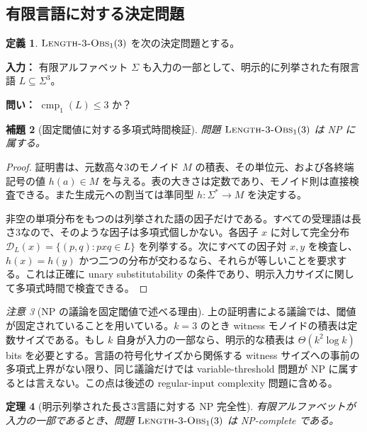 \documentclass[10pt,a4paper]{ltjsarticle}
\newtheorem{theorem}{定理}[section]
\newtheorem{lemma}[theorem]{補題}
\theoremstyle{definition}
\newtheorem{definition}[theorem]{定義}
\theoremstyle{remark}
\newtheorem{remark}[theorem]{注意}
\newcommand{\cmp}{\operatorname{cmp}}
\newcommand{\D}{\mathcal D}
\begin{document}
\subsection{有限言語に対する決定問題}

\begin{definition}
\({\normalfont\textsc{Length-3-Obs}}_1(3)\)
を次の決定問題とする。

\medskip
\noindent
\textbf{入力：} 有限アルファベット \(\Sigma\) も入力の一部として、明示的に列挙された有限言語
\(L\subseteq\Sigma^3\)。

\noindent
\textbf{問い：} \(\cmp_1(L)\le3\) か？
\end{definition}

\begin{lemma}[固定閾値に対する多項式時間検証]
\label{graph:lem:np}
問題
\(
{\normalfont\textsc{Length-3-Obs}}_1(3)
\)
は NP に属する。
\end{lemma}

\begin{proof}
証明書は、元数高々3のモノイド $M$ の積表、その単位元、および各終端記号の値 $h(a)\in M$ を与える。表の大きさは定数であり、モノイド則は直接検査できる。また生成元への割当ては準同型
\(h:\Sigma^*\to M\)
を決定する。

非空の単項分布をもつのは列挙された語の因子だけである。すべての受理語は長さ3なので、そのような因子は多項式個しかない。各因子 $x$ に対して完全分布
\(\D_L(x)=\{(p,q):pxq\in L\}\)
を列挙する。次にすべての因子対 $x,y$ を検査し、$h(x)=h(y)$ かつ二つの分布が交わるなら、それらが等しいことを要求する。これは正確に unary substitutability の条件であり、明示入力サイズに関して多項式時間で検査できる。
\end{proof}

\begin{remark}[NP の議論を固定閾値で述べる理由]
上の証明書による議論では、閾値が固定されていることを用いている。$k=3$ のとき witness モノイドの積表は定数サイズである。もし $k$ 自身が入力の一部なら、明示的な積表は
\(\Theta(k^2\log k)\)
bits を必要とする。言語の符号化サイズから関係する witness サイズへの事前の多項式上界がない限り、同じ議論だけでは variable-threshold 問題が NP に属するとは言えない。この点は後述の regular-input complexity 問題に含める。
\end{remark}

\begin{theorem}[明示列挙された長さ3言語に対する NP 完全性]
\label{graph:thm:npcomplete}
有限アルファベットが入力の一部であるとき、問題
\({\normalfont\textsc{Length-3-Obs}}_1(3)\)
は NP-complete である。
\end{theorem}
\end{document}
